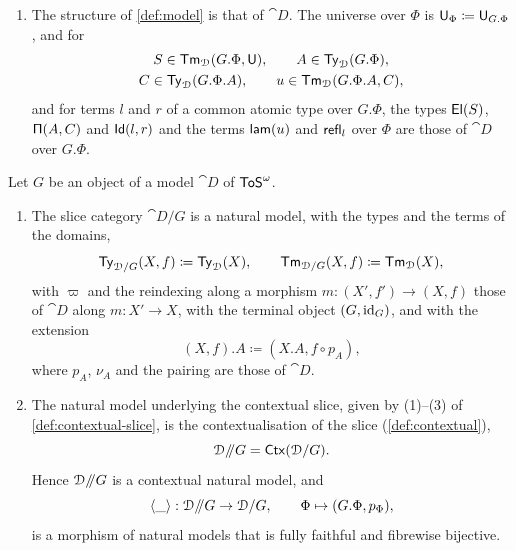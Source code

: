 \begin{definition}
\begin{enumerate}
        \item The structure of \cref{def:model} is that of $\cat{D}$. The universe over $\Phi$ is $\mathsf{U}_\Phi \coloneqq \mathsf{U}_{G.\Phi}$, and for
        \begin{gather*}
            S \in \mathsf{Tm}_{\mathcal{D}}(G.\Phi, \mathsf{U}), \qquad A \in \mathsf{Ty}_{\mathcal{D}}(G.\Phi),\\
            C \in \mathsf{Ty}_{\mathcal{D}}(G.\Phi.A), \qquad u \in \mathsf{Tm}_{\mathcal{D}}(G.\Phi.A, C),
        \end{gather*}
        and for terms $l$ and $r$ of a common atomic type over $G.\Phi$, the types $\mathsf{El}(S)$, $\mathsf{\Pi}(A, C)$ and $\mathsf{Id}(l, r)$ and the terms $\mathsf{lam}(u)$ and $\mathsf{refl}_l$ over $\Phi$ are those of $\cat{D}$ over $G.\Phi$.
    \end{enumerate}
\end{definition}

\begin{lemma}\label{lem:slice-contextualisation}
    Let $G$ be an object of a model $\cat{D}$ of $\mathsf{ToS}^\omega$.
    \begin{enumerate}
        \item The slice category $\cat{D}/G$ is a natural model, with the types and the terms of the domains,
        \[
            \mathsf{Ty}_{\mathcal{D}/G}(X, f) \coloneqq \mathsf{Ty}_{\mathcal{D}}(X), \qquad \mathsf{Tm}_{\mathcal{D}/G}(X, f) \coloneqq \mathsf{Tm}_{\mathcal{D}}(X),
        \]
        with $\varpi$ and the reindexing along a morphism $m : (X', f') \to (X, f)$ those of $\cat{D}$ along $m : X' \to X$, with the terminal object $(G, \mathrm{id}_G)$, and with the extension
        \[
            (X, f).A \coloneqq (X.A, f \circ p_A),
        \]
        where $p_A$, $\nu_A$ and the pairing are those of $\cat{D}$.
        \item The natural model underlying the contextual slice, given by (1)--(3) of \cref{def:contextual-slice}, is the contextualisation of the slice (\cref{def:contextual}),
        \[
            \mathcal{D}\mathord{/\mkern-5mu/} G = \mathsf{Ctx}(\mathcal{D}/G).
        \]
        Hence $\mathcal{D}\mathord{/\mkern-5mu/} G$ is a contextual natural model, and
        \[
            \langle \_ \rangle : \mathcal{D}\mathord{/\mkern-5mu/} G \to \mathcal{D}/G, \qquad \Phi \mapsto (G.\Phi, p_\Phi),
        \]
        is a morphism of natural models that is fully faithful and fibrewise bijective.
    \end{enumerate}
\end{lemma}

